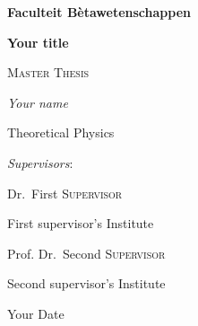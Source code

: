 \documentclass[thesis]{subfiles}
\begin{document}
\begin{titlepage}
    \begin{flushright}
    {\LARGE\bfseries Faculteit B\`etawetenschappen \par} %
    \end{flushright}
	\vspace{1cm}
    \begin{center}
    {\huge\bfseries Your title \par} %
    \end{center}
	\vspace{1cm}
    {\scshape\Large Master Thesis\par}
	\vspace{0.75cm} %
	{\Large\itshape Your name\par} %
    \vspace{0.5cm}
    {\Large Theoretical Physics}\par %
    \vspace{0.5cm}
    \centering
    \frame{%
    } %
    \vspace{0.5cm}
    \par
    \raggedleft
	{\Large\itshape Supervisors}:\par\vspace{0.25cm}
	{\large Dr.~First \textsc{Supervisor}\par} %
    First supervisor's Institute\par %
    \vspace{0.25cm}
    {\large Prof. Dr.~Second \textsc{Supervisor}\par} %
    Second supervisor's Institute %

	\vfill
	{\large Your Date\par}%
    
\end{titlepage}    

\restoregeometry %
\end{document}
